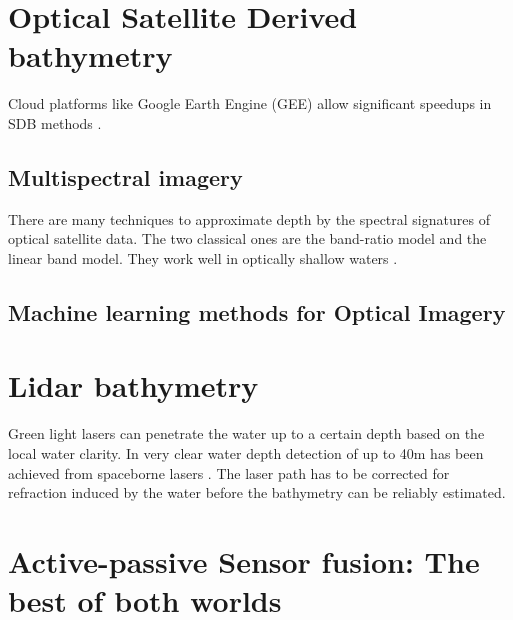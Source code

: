 \section{Optical Satellite Derived bathymetry}

Cloud platforms like Google Earth Engine (GEE) \parencite{Gorelick2017a} allow significant speedups in SDB methods \parencite{Pike2019}. 


\subsection{Multispectral imagery}

There are many techniques to approximate depth by the spectral signatures of optical satellite data. The two classical ones are the band-ratio model and the linear band model. They work well in optically shallow waters \parencite{Salameh2019}.

\subsection{Machine learning methods for Optical Imagery}


\section{Lidar bathymetry}

Green light lasers can penetrate the water up to a certain depth based on the local water clarity. In very clear water depth detection of up to 40m has been achieved from spaceborne lasers \parencite{Parrish2019}. The laser path has to be corrected for refraction induced by the water before the bathymetry can be reliably estimated.

\section{Active-passive Sensor fusion: The best of both worlds}

